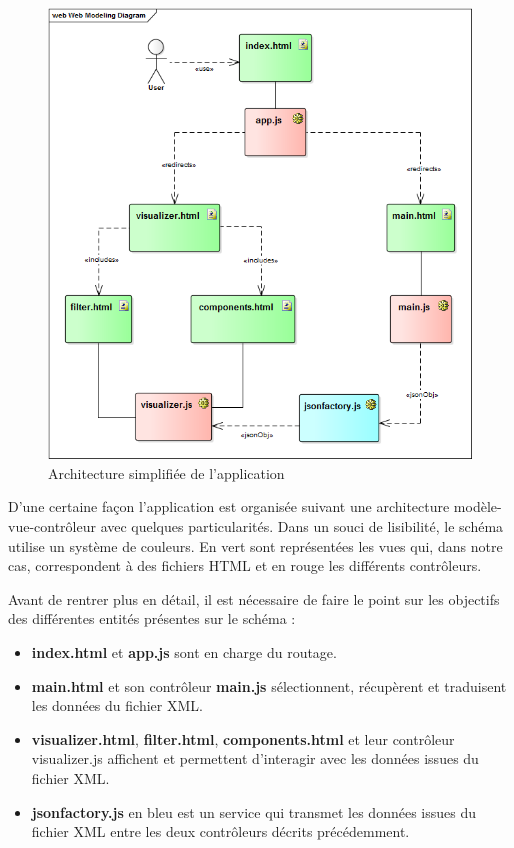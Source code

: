 \documentclass [a4paper,11pt]{article}
\begin{document}
\begin{figure}[H]
\centering
\includegraphics[scale=0.5]{img/ped_architecture.png}
\caption[Figure 6]{Architecture simplifiée de l'application}
\end{figure}

D’une certaine façon l’application est organisée suivant une architecture modèle-vue-contrôleur avec quelques particularités. Dans un souci de lisibilité, le schéma utilise un système de couleurs. En vert sont représentées les vues qui, dans notre cas, correspondent à des fichiers HTML et en rouge les différents contrôleurs.\newline
  
Avant de rentrer plus en détail, il est nécessaire de faire le point sur les objectifs des différentes entités présentes sur le schéma :
\newline

\begin{itemize}
 \item \textbf{index.html} et \textbf{app.js} sont en charge du routage.
 \item \textbf{main.html} et son contrôleur \textbf{main.js} sélectionnent, récupèrent et traduisent les données du fichier XML.
 \item \textbf{visualizer.html}, \textbf{filter.html}, \textbf{components.html} et leur contrôleur visualizer.js affichent et permettent d’interagir avec les données issues du fichier XML.
 \item \textbf{jsonfactory.js} en bleu est un service qui transmet les données issues du fichier XML entre les deux contrôleurs décrits précédemment.
 \newline
\end{itemize}
\end{document}
